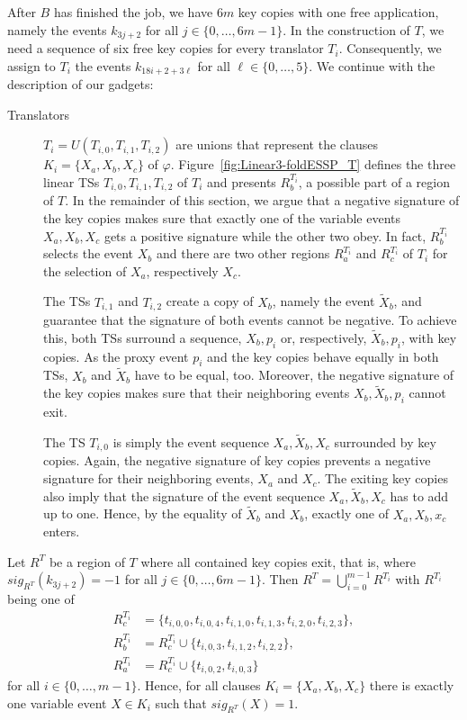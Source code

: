 \documentclass[english]{lipics_hacked}
\begin{document}
After $B$ has finished the job, we have $6m$ key copies with one free application, namely the events $k_{3j+2}$ for all $j \in \{0, \dots, 6m-1\}$.
In the construction of $T$, we need a sequence of six free key copies for every translator $T_i$. 
Consequently, we assign to $T_i$ the events $k_{18i+2+3\ell}$ for all $\ell \in \{0, \dots, 5\}$.
We continue with the description of our gadgets:
%
\begin{description}
\item[Translators] 
$T_i = U(T_{i,0},T_{i,1},T_{i,2})$ are unions that represent the clauses $K_i = \{X_a,X_b,X_c\}$ of $\varphi$.
Figure~\ref{fig:Linear3-foldESSP_T} defines the three linear TSs $T_{i,0},T_{i,1},T_{i,2}$ of $T_i$ and presents $R^{T_i}_b$, a possible part of a region of $T$.
In the remainder of this section, we argue that a negative signature of the key copies makes sure that exactly one of the variable events $X_a,X_b,X_c$ gets a positive signature while the other two obey.
In fact, $R^{T_i}_b$ selects the event $X_b$ and there are two other regions $R^{T_i}_a$ and $R^{T_i}_c$ of $T_i$ for the selection of $X_a$, respectively $X_c$.

The TSs $T_{i,1}$ and $T_{i,2}$ create a copy of $X_b$, namely the event $\tilde{X}_b$, and guarantee that the signature of both events cannot be negative.
To achieve this, both TSs surround a sequence, $X_b, p_i$ or, respectively, $\tilde{X}_b, p_i$, with key copies.
As the proxy event $p_i$ and the key copies behave equally in both TSs, $X_b$ and $\tilde{X}_b$ have to be equal, too.
Moreover, the negative signature of the key copies makes sure that their neighboring events $X_b, \tilde{X}_b, p_i$ cannot exit.

The TS $T_{i,0}$ is simply the event sequence $X_a,\tilde{X}_b,X_c$ surrounded by key copies.
Again, the negative signature of key copies prevents a negative signature for their neighboring events, $X_a$ and $X_c$.
The exiting key copies also imply that the signature of the event sequence $X_a,\tilde{X}_b,X_c$ has to add up to one.
Hence, by the equality of $\tilde{X}_b$ and $X_b$, exactly one of $X_a,X_b,x_c$ enters.
\end{description}
%
\begin{lemma}
\label{lemma:KeyRegionT}
Let $R^T$ be a region of $T$ where all contained key copies exit, that is, where $sig_{R^T}(k_{3j+2}) = -1$ for all $j \in \{0, \dots, 6m-1\}$.
Then $R^T = \bigcup_{i=0}^{m-1} R^{T_i}$ with $R^{T_i}$ being one of  
%
\begin{align*}
R^{T_i}_c &= \{t_{i,0,0}, t_{i,0,4}, t_{i,1,0}, t_{i,1,3}, t_{i,2,0}, t_{i,2,3}\},\\
R^{T_i}_b &= R^{T_i}_c \cup \{t_{i,0,3}, t_{i,1,2}, t_{i,2,2}\},\\
R^{T_i}_a &= R^{T_i}_c \cup \{t_{i,0,2}, t_{i,0,3}\}
\end{align*}
%
for all $i \in \{0, \dots, m-1\}$.
Hence, for all clauses $K_i = \{X_a, X_b, X_c\}$ there is exactly one variable event $X \in K_i$ such that $sig_{R^T}(X) = 1$.
\end{lemma}
\end{document}
